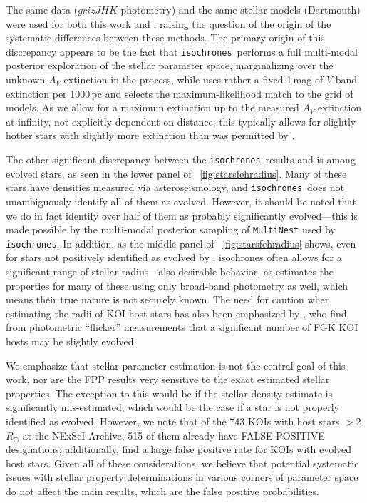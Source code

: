 \documentclass{emulateapj}
\newcommand{\figref}[1]{\ref{fig:#1}}
\newcommand{\Fig}[1]{\figurename~\figref{#1}}
\newcommand{\fig}[1]{\Fig{#1}}
\newcommand{\isochrones}{\texttt{isochrones}}
\begin{document}
The same data ($grizJHK$ photometry) and the same stellar models
(Dartmouth) were used for both this work and
, raising the question of the origin of the
systematic differences between these methods.  The primary origin of
this discrepancy appears to be the fact that \isochrones\ performs a
full multi-modal posterior exploration of the stellar parameter space,
marginalizing over the unknown $A_V$ extinction in the process, while
 uses rather a fixed 1\,mag of $V$-band
extinction per 1000\,pc and selects the maximum-likelihood
match to the grid of models.  As we allow for a maximum extinction up
to the measured $A_V$ extinction at infinity, not explicitly dependent
on distance, this typically allows for slightly hotter stars with
slightly more extinction than was permitted by \citet{Dressing:2013}.

The other significant discrepancy between the \isochrones\ results and
 is among evolved stars, as seen in the lower
panel of \fig{starsfehradius}.  Many of these stars have densities
measured via asteroseismology, and \isochrones\ does not unambiguously
identify all of them as evolved.  However, it should be noted that we
do in fact identify over half of them as probably significantly
evolved---this is made possible by the multi-modal posterior sampling
of \texttt{MultiNest} used by \isochrones.  In addition, as the middle
panel of \fig{starsfehradius} shows, even for stars not positively
identified as evolved by , isochrones often
allows for a significant range of stellar radius---also desirable
behavior, as  estimates the properties for many
of these using only broad-band photometry as well, which means their
true nature is not securely known.  The need for caution when
estimating the radii of KOI host stars has also been emphasized by
, who find from photometric ``flicker''
measurements that a significant number of FGK KOI hosts may be
slightly evolved.

We emphasize that stellar parameter estimation is not the central goal
of this work, nor are the FPP results very sensitive to the exact
estimated stellar properties.  The exception to this would be if the
stellar density estimate is significantly mis-estimated, which would
be the case if a star is not properly identified as evolved.  However, we
note that of the 743 KOIs with host stars $>$2\,$R_{\odot}$ at the 
NExScI Archive, 515 of them already have FALSE POSITIVE designations;
additionally, \citet{Sliski:2014} find a large false positive rate for
KOIs with evolved host stars.  Given all of these considerations, we
believe that potential systematic issues with stellar property
determinations in various corners of parameter space do not affect the
main results, which are the false positive probabilities.
\end{document}
